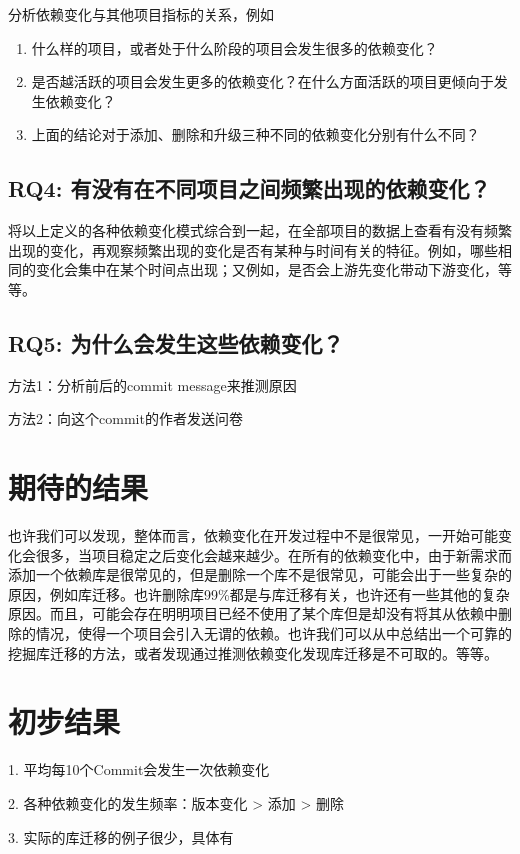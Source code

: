 \documentclass[UTF8]{ctexart}
\begin{document}
分析依赖变化与其他项目指标的关系，例如
\begin{enumerate}
	\item 什么样的项目，或者处于什么阶段的项目会发生很多的依赖变化？
	\item 是否越活跃的项目会发生更多的依赖变化？在什么方面活跃的项目更倾向于发生依赖变化？
	\item 上面的结论对于添加、删除和升级三种不同的依赖变化分别有什么不同？
\end{enumerate}

\subsection{RQ4: 有没有在不同项目之间频繁出现的依赖变化？}

将以上定义的各种依赖变化模式综合到一起，在全部项目的数据上查看有没有频繁出现的变化，再观察频繁出现的变化是否有某种与时间有关的特征。例如，哪些相同的变化会集中在某个时间点出现；又例如，是否会上游先变化带动下游变化，等等。

\subsection{RQ5: 为什么会发生这些依赖变化？}

方法1：分析前后的commit message来推测原因

方法2：向这个commit的作者发送问卷

\section{期待的结果}

也许我们可以发现，整体而言，依赖变化在开发过程中不是很常见，一开始可能变化会很多，当项目稳定之后变化会越来越少。在所有的依赖变化中，由于新需求而添加一个依赖库是很常见的，但是删除一个库不是很常见，可能会出于一些复杂的原因，例如库迁移。也许删除库99\%都是与库迁移有关，也许还有一些其他的复杂原因。而且，可能会存在明明项目已经不使用了某个库但是却没有将其从依赖中删除的情况，使得一个项目会引入无谓的依赖。也许我们可以从中总结出一个可靠的挖掘库迁移的方法，或者发现通过推测依赖变化发现库迁移是不可取的。等等。

\section{初步结果}

1. 平均每10个Commit会发生一次依赖变化

2. 各种依赖变化的发生频率：版本变化 > 添加 > 删除

3. 实际的库迁移的例子很少，具体有




\end{document}
